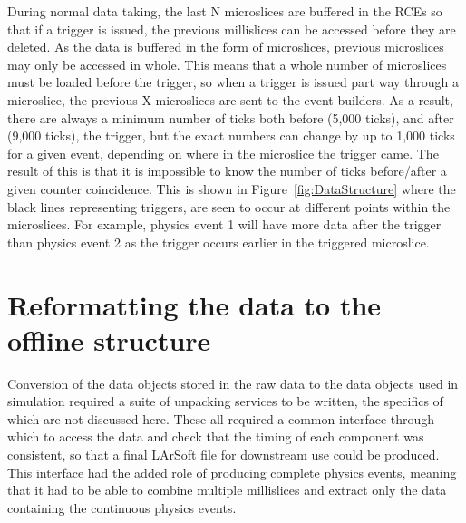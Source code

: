 During normal data taking, the last N microslices are buffered in the RCEs so that if a trigger is issued, the previous millislices can be accessed before they are deleted. As the data is buffered in the form of microslices, previous microslices may only be accessed in whole. This means that a whole number of microslices must be loaded before the trigger, so when a trigger is issued part way through a microslice, the previous X microslices are sent to the event builders. As a result, there are always a minimum number of ticks both before (5,000 ticks), and after (9,000 ticks), the trigger, but the exact numbers can change by up to 1,000 ticks for a given event, depending on where in the microslice the trigger came. The result of this is that it is impossible to know the number of ticks before/after a given counter coincidence. This is shown in Figure~\ref{fig:DataStructure} where the black lines representing triggers, are seen to occur at different points within the microslices. For example, physics event 1 will have more data after the trigger than physics event 2 as the trigger occurs earlier in the triggered microslice.

\section{Reformatting the data to the offline structure} \label{Reformatting the data to the offline structure} %
Conversion of the data objects stored in the raw data to the data objects used in simulation required a suite of unpacking services to be written, the specifics of which are not discussed here. These all required a common interface through which to access the data and check that the timing of each component was consistent, so that a final LArSoft file for downstream use could be produced. This interface had the added role of producing complete physics events, meaning that it had to be able to combine multiple millislices and extract only the data containing the continuous physics events. \\

